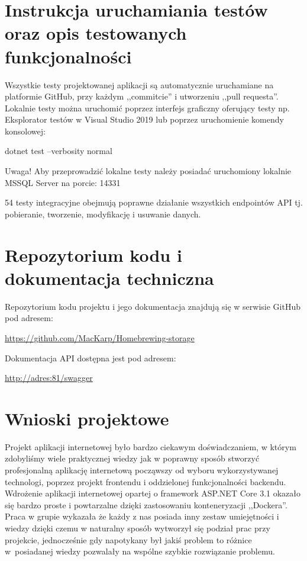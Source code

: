 \documentclass[12pt,a4paper]{article}
\begin{document}
	\section{Instrukcja uruchamiania testów oraz opis testowanych funkcjonalności}
		\indent Wszystkie testy projektowanej aplikacji są automatycznie uruchamiane na platformie GitHub, przy każdym ,,commitcie'' i utworzeniu ,,pull requesta''.
			Lokalnie testy można uruchomić poprzez interfejs graficzny oferujący testy np. Eksplorator testów w Visual Studio 2019 lub poprzez uruchomienie komendy konsolowej:
				\begin{tcolorbox}[minipage,colback=white,arc=0pt,outer arc=0pt, fontupper=\scriptsize]
					dotnet test --verbosity normal
				\end{tcolorbox}
				\begin{tcolorbox}[minipage,colback=white,arc=0pt,outer arc=0pt, fontupper=\scriptsize]
					Uwaga! Aby przeprowadzić lokalne testy należy posiadać uruchomiony lokalnie MSSQL Server na porcie: 14331
				\end{tcolorbox}
				 54 testy integracyjne obejmują poprawne działanie wszystkich endpointów API tj. pobieranie, tworzenie, modyfikację i usuwanie danych.     
	\newpage
	
	\section{Repozytorium kodu i dokumentacja techniczna}
		\indent Repozytorium kodu projektu i jego dokumentacja znajdują się w serwisie GitHub pod adresem: 
			\begin{tcolorbox}[minipage,colback=white,arc=0pt,outer arc=0pt, fontupper=\scriptsize]
				\url{https://github.com/MacKarp/Homebrewing-storage}
			\end{tcolorbox}
		\indent Dokumentacja API dostępna jest pod adresem:
			\begin{tcolorbox}[minipage,colback=white,arc=0pt,outer arc=0pt, fontupper=\scriptsize]
				\url{http://adres:81/swagger}
			\end{tcolorbox}
	\newpage
	
	\section{Wnioski projektowe}
		\indent Projekt aplikacji internetowej było bardzo ciekawym doświadczaniem, w którym zdobyliśmy wiele praktycznej wiedzy jak w poprawny sposób
			stworzyć profesjonalną aplikację internetową począwszy od wyboru wykorzystywanej technologi, poprzez projekt frontendu i oddzielonej funkcjonalności backendu.
			Wdrożenie aplikacji internetowej opartej o framework ASP.NET Core 3.1 okazało się bardzo proste i powtarzalne dzięki zastosowaniu konteneryzacji ,,Dockera''.
			Praca w grupie wykazała że każdy z nas posiada inny zestaw umiejętności i wiedzy dzięki czemu w naturalny sposób wytworzył się podział prac przy projekcie,
			jednocześnie gdy napotykany był jakiś problem to różnice w~posiadanej wiedzy pozwalały na wspólne szybkie rozwiązanie problemu. 
\end{document}
